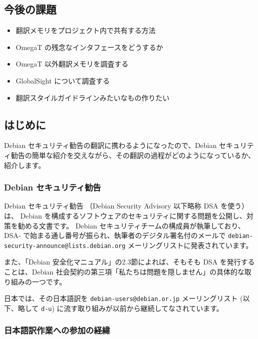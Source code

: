 \documentclass[mingoth,a4paper]{jsarticle}
\begin{document}
\subsection{今後の課題}
\begin{itemize}
    \item 翻訳メモリをプロジェクト内で共有する方法
    \item OmegaT の残念なインタフェースをどうするか
    \item OmegaT 以外翻訳メモリを調査する
    \item GlobalSight について調査する
    \item 翻訳スタイルガイドラインみたいなもの作りたい
\end{itemize}
\clearpage

\newcommand{\email}[1]{{\tt{}#1}}
\subsection{はじめに}

Debian セキュリティ勧告の翻訳に携わるようになったので、Debian セキュリティ勧告の簡単な紹介を交えながら、その翻訳の過程がどのようになっているか、紹介します。

\subsubsection{Debian セキュリティ勧告}

Debian セキュリティ勧告 （Debian Security Advisory 以下略称 DSA を使う）は、
Debian を構成するソフトウェアのセキュリティに関する問題を公開し、対策を勧める文書です。
Debian セキュリティチームの構成員が執筆しており、DSA- で始まる通し番号が振られ、執筆者のデジタル署名付のメールで \email{debian-security-announce@lists.debian.org} メーリングリストに発表されています。

また、「Debian 安全化マニュアル」の2.3節\cite{securehowto2.3}によれば、そもそも DSA を発行することは、Debian 社会契約\cite{socialcontract}の第三項「私たちは問題を隠しません」の具体的な取り組みの一つです。

日本では、その日本語訳を \email{debian-users@debian.or.jp} メーリングリスト (以下、略して \email{d-u}) に流す取り組みが以前から継続してなされています。


\subsubsection{日本語訳作業への参加の経緯}
\end{document}
